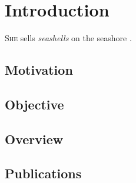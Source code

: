 \chapter{Introduction}
\textsc{She} sells \emph{seashells} on the seashore \cite{goodfellow2016}.

\section{Motivation}
\lipsum[1]

\section{Objective}
\lipsum[1]

\section{Overview}
\lipsum[1]

\section{Publications}
\printbibliography[heading=none,keyword=own]
